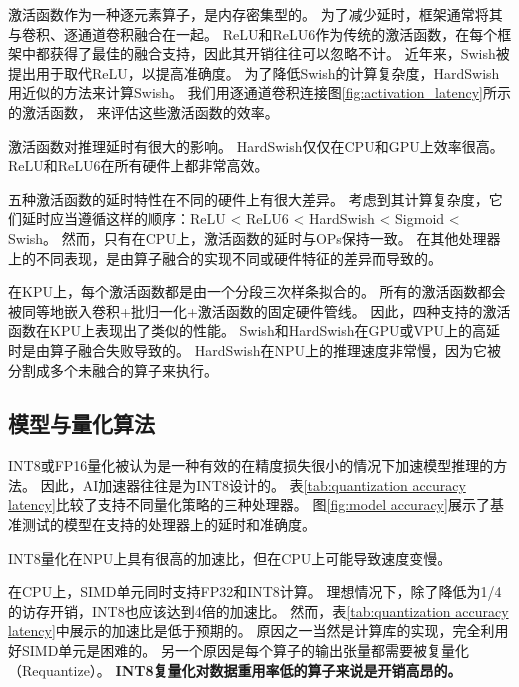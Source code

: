 
激活函数作为一种逐元素算子，是内存密集型的。
为了减少延时，框架通常将其与卷积、逐通道卷积融合在一起。
ReLU和ReLU6作为传统的激活函数，在每个框架中都获得了最佳的融合支持，因此其开销往往可以忽略不计。
近年来，Swish被提出用于取代ReLU，以提高准确度。
为了降低Swish的计算复杂度，HardSwish用近似的方法来计算Swish。
我们用逐通道卷积连接图\ref{fig:activation_latency}所示的激活函数，
来评估这些激活函数的效率。

\begin{finding}
    激活函数对推理延时有很大的影响。
    HardSwish仅仅在CPU和GPU上效率很高。
    ReLU和ReLU6在所有硬件上都非常高效。
\end{finding}

五种激活函数的延时特性在不同的硬件上有很大差异。
考虑到其计算复杂度，它们延时应当遵循这样的顺序：ReLU < ReLU6 < HardSwish < Sigmoid < Swish。
然而，只有在CPU上，激活函数的延时与OPs保持一致。
在其他处理器上的不同表现，是由算子融合的实现不同或硬件特征的差异而导致的。

在KPU上，每个激活函数都是由一个分段三次样条拟合的。
所有的激活函数都会被同等地嵌入卷积+批归一化+激活函数的固定硬件管线。
因此，四种支持的激活函数在KPU上表现出了类似的性能。
Swish和HardSwish在GPU或VPU上的高延时是由算子融合失败导致的。
HardSwish在NPU上的推理速度非常慢，因为它被分割成多个未融合的算子来执行。

\subsection{模型与量化算法}
\label{analysis:model quantization}


INT8或FP16量化被认为是一种有效的在精度损失很小的情况下加速模型推理的方法。
因此，AI加速器往往是为INT8设计的。
表\ref{tab:quantization accuracy latency}比较了支持不同量化策略的三种处理器。
图\ref{fig:model accuracy}展示了基准测试的模型在支持的处理器上的延时和准确度。

\begin{finding}
    INT8量化在NPU上具有很高的加速比，但在CPU上可能导致速度变慢。
\end{finding}

在CPU上，SIMD单元同时支持FP32和INT8计算。
理想情况下，除了降低为1/4的访存开销，INT8也应该达到4倍的加速比。
然而，表\ref{tab:quantization accuracy latency}中展示的加速比是低于预期的。
原因之一当然是计算库的实现，完全利用好SIMD单元是困难的。
另一个原因是每个算子的输出张量都需要被复量化（Requantize）。
\textbf{INT8复量化对数据重用率低的算子来说是开销高昂的。}

